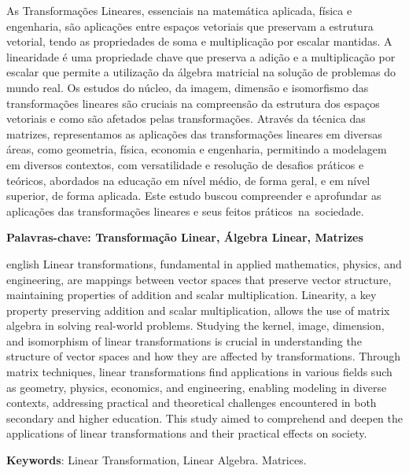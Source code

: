 \documentclass[
12pt,
 a4paper,
    english,
    brazil,
    oneside
    ]{abntex2}
\begin{document}
	
	\setlength{\absparsep}{18pt} %
	\begin{resumo}
		As Transformações Lineares, essenciais na matemática aplicada, física e engenharia, são aplicações entre espaços vetoriais que preservam a estrutura vetorial, tendo as propriedades de soma e multiplicação por escalar mantidas. A linearidade é uma propriedade chave que preserva a adição e a multiplicação por escalar que permite a utilização da álgebra matricial na solução de problemas do mundo real.
		Os estudos do núcleo, da imagem, dimensão e isomorfismo das transformações lineares são cruciais na compreensão da estrutura dos espaços vetoriais e como são afetados pelas transformações. 
		Através da técnica das matrizes, representamos as aplicações das transformações lineares em diversas áreas, como geometria, física, economia e engenharia, permitindo a modelagem em diversos contextos, com versatilidade e resolução de desafios práticos e teóricos, abordados na educação em nível médio, de forma geral, e em nível superior, de forma aplicada.
		Este estudo buscou compreender e aprofundar as aplicações das transformações lineares e seus feitos práticos na sociedade.
		
		\textbf{Palavras-chave: Transformação Linear, Álgebra Linear, Matrizes}
	\end{resumo}
		
	
	\begin{resumo}[Abstract]
		\begin{otherlanguage*}{english}
			Linear transformations, fundamental in applied mathematics, physics, and engineering, are mappings between vector spaces that preserve vector structure, maintaining properties of addition and scalar multiplication. Linearity, a key property preserving addition and scalar multiplication, allows the use of matrix algebra in solving real-world problems. Studying the kernel, image, dimension, and isomorphism of linear transformations is crucial in understanding the structure of vector spaces and how they are affected by transformations. Through matrix techniques, linear transformations find applications in various fields such as geometry, physics, economics, and engineering, enabling modeling in diverse contexts, addressing practical and theoretical challenges encountered in both secondary and higher education. This study aimed to comprehend and deepen the applications of linear transformations and their practical effects on society.
			
			\vspace{\onelineskip}
			
			\noindent 
			\textbf{Keywords}: Linear Transformation, Linear Algebra. Matrices.
		\end{otherlanguage*}
	\end{resumo}
	
\end{document}
